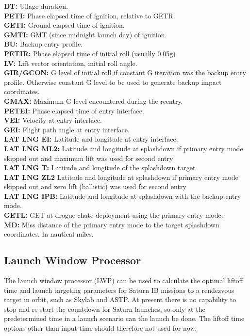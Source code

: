 \documentclass[11pt]{article} %
\begin{document}
\textbf{DT:} Ullage duration.\\
\textbf{PETI:} Phase elapsed time of ignition, relative to GETR.\\
\textbf{GETI:} Ground elapsed time of ignition.\\
\textbf{GMTI:} GMT (since midnight launch day) of ignition.\\
\textbf{BU:} Backup entry profile.\\
\textbf{PETIR:} Phase elapsed time of initial roll (usually 0.05g)\\
\textbf{LV:} Lift vector orientation, initial roll angle.\\
\textbf{GIR/GCON:} G level of initial roll if constant G iteration was the backup entry profile. Otherwise constant G level to be used to generate backup impact coordinates.\\
\textbf{GMAX:} Maximum G level encountered during the reentry.\\
\textbf{PETEI:} Phase elapsed time of entry interface.\\
\textbf{VEI:} Velocity at entry interface.\\
\textbf{GEI:} Flight path angle at entry interface.\\  
\textbf{LAT LNG EI:} Latitude and longitude at entry interface.\\
\textbf{LAT LNG ML2:} Latitude and longitude at splashdown if primary entry mode skipped out and maximum lift was used for second entry\\
\textbf{LAT LNG T:} Latitude and longitude of the splashdown target\\
\textbf{LAT LNG ZL2} Latitude and longitude at splashdown if primary entry mode skipped out and zero lift (ballistic) was used for second entry\\
\textbf{LAT LNG IPB:} Latitude and longitude at splashdown with the backup entry mode.\\
\textbf{GETL:} GET at drogue chute deployment using the primary entry mode:\\
\textbf{MD:} Miss distance of the primary entry mode to the target splashdown coordinates. In nautical miles.\\

\newpage
\subsection{Launch Window Processor}

The launch window processor (LWP) can be used to calculate the optimal liftoff time and launch targeting parameters for Saturn IB missions to a rendezvous target in orbit, such as Skylab and ASTP. At present there is no capability to stop and re-start the countdown for Saturn launches, so only at the predetermined time in a launch scenario can the launch be done. The liftoff time options other than input time should therefore not used for now.\\
\end{document}
